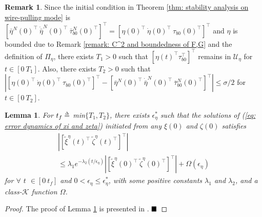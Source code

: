 \documentclass[letterpaper, 10 pt, conference]{ieeeconf}  %
\def\delequal{\mathrel{\ensurestackMath{\stackon[1pt]{=}{\scriptscriptstyle\Delta}}}}
\newtheorem{lemma}{Lemma}
\theoremstyle{definition}
\newtheorem{remark}{Remark}
\begin{document}
\begin{remark} \label{remark: remaining in U_eta}
Since the initial condition in Theorem \ref{thm: stability analysis on wire-pulling mode} is $[\bar{\eta}^N(0)^{\top} \ \dot{\bar{\eta}}^N(0)^{\top} \ \bar{\tau}^N_{b 0}(0)^{\top}]^{\top} = [\eta(0)^{\top} \ \dot{\eta}(0)^{\top} \ \tau_{b 0}(0)^{\top}]^{\top}$ and $\eta$ is bounded due to Remark \ref{remark: C^2 and boundedness of F,G} and the definition of $\Pi_{\eta}$, there exists $T_1 > 0$ such that $[\eta(t)^{\top} \tau_{b 0}^{\top}]^{\top}$ remains in $\mathcal{U}_{\eta}$ for $t \in [0 \ T_1]$. Also, there exists $T_2>0$ such that $| [\eta(0)^{\top} \ \dot{\eta}(0)^{\top} \ \tau_{b 0}(0)^{\top}]^{\top} - [\bar{\eta}^N(0)^{\top} \ \dot{\bar{\eta}}^N(0)^{\top} \ \bar{\tau}^N_{b 0}(0)^{\top}]^{\top} | \leq \sigma/2$ for $t \in [0 \ T_2]$.
\end{remark}

\begin{lemma} \label{lemma: equation for exponential stability of fast dynamics}
For $t_f \delequal$ min$\{ T_1, T_2 \}$, there exists $\epsilon^*_{\eta}$ such that the solutions of (\ref{eq: error dynamics of xi and zeta}) initiated from any $\xi(0)$ and $\zeta(0)$ satisfies
\begin{multline} \label{eq: equation for exponential stability of fast dynamics}
    | [\tilde{\xi}^{\eta}(t)^{\top} \ \tilde{\zeta}^{\eta}(t)^{\top}]^{\top} | \\ \leq \lambda_1 e^{-\lambda_2 (t/\epsilon_{\eta})} | [\tilde{\xi}^{\eta}(0)^{\top} \ \tilde{\zeta}^{\eta}(0)^{\top}]^{\top} | + \Omega(\epsilon_{\eta})
\end{multline}
for $\forall$ $t$ $\in [0 \ t_f]$ and $0 < \epsilon_{\eta} \leq \epsilon^{*}_{\eta}$, with some positive constants $\lambda_1$ and $\lambda_2$, and a class-$\mathcal{K}$ function $\Omega$.
\end{lemma}
\begin{proof}
The proof of Lemma \ref{lemma: equation for exponential stability of fast dynamics} is presented in \cite{lee2020aerial_2}. $\hfill \blacksquare$
\end{proof}
\end{document}
